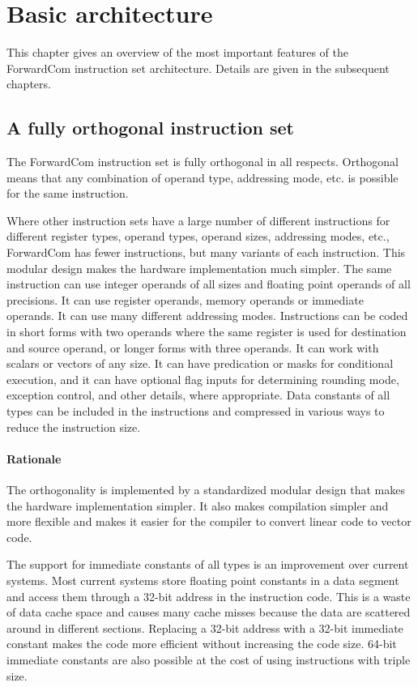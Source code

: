 \documentclass[forwardcom.tex]{subfiles}
\begin{document}
\RaggedRight

\chapter{Basic architecture}

This chapter gives an overview of the most important features of the ForwardCom instruction set architecture. Details are given in the subsequent chapters.

\section{A fully orthogonal instruction set}
The ForwardCom instruction set is fully orthogonal in all respects. 
Orthogonal means that any combination of operand type, addressing mode, etc. is possible for the same instruction. 
\vv

Where other instruction sets have a large number of different instructions for different register types, operand types, operand sizes, addressing modes, etc., ForwardCom has fewer instructions, but many variants of each instruction. This modular design makes the hardware implementation much simpler.
The same instruction can use integer operands of all sizes and floating point operands of all precisions. It can use register operands, memory operands or immediate operands. It can use many different addressing modes. Instructions can be coded in short forms with two operands where the same register is used for destination and source operand, or longer forms with three operands. It can work with scalars or vectors of any size. It can have predication or masks for conditional execution, and it can have optional flag inputs for determining rounding mode, exception control, and other details, where appropriate. Data constants of all types can be included in the instructions and compressed in various ways to reduce the instruction size.

\subsubsection{Rationale}
The orthogonality is implemented by a standardized modular design that makes the hardware implementation simpler. It also makes compilation simpler and more flexible and makes it easier for the compiler to convert linear code to vector code.
\vv

The support for immediate constants of all types is an improvement over current systems. Most current systems store floating point constants in a data segment and access them through a 32-bit address in the instruction code. This is a waste of data cache space and causes many cache misses because the data are scattered around in different sections. Replacing a 32-bit address with a 32-bit immediate constant makes the code more efficient without increasing the code size. 64-bit immediate constants  are also possible at the cost of using instructions with triple size.
\end{document}
